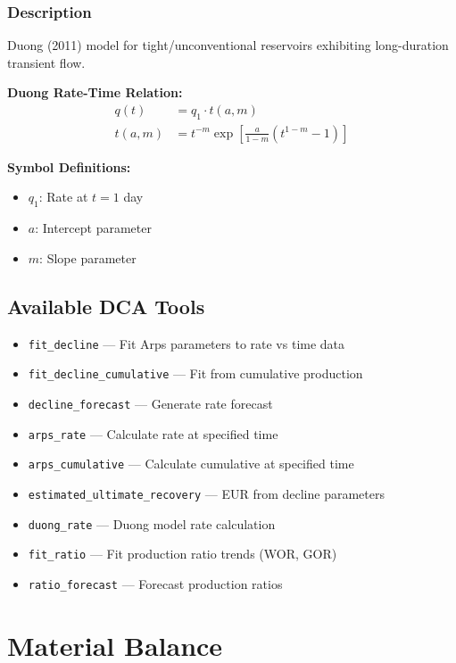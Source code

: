\documentclass[11pt,a4paper]{article}
\newcommand{\symitem}[2]{\item \textbf{#1}: #2}
\begin{document}
\subsubsection{Description}
Duong (2011) model for tight/unconventional reservoirs exhibiting long-duration transient flow.

\begin{tcolorbox}[colback=formulabox,colframe=black!75]
\textbf{Duong Rate-Time Relation:}
\begin{align}
q(t) &= q_1 \cdot t(a, m) \\
t(a, m) &= t^{-m} \exp\left[ \frac{a}{1-m} (t^{1-m} - 1) \right]
\end{align}
\end{tcolorbox}

\textbf{Symbol Definitions:}
\begin{itemize}[leftmargin=2cm]
\symitem{$q_1$}{Rate at $t=1$ day}
\symitem{$a$}{Intercept parameter}
\symitem{$m$}{Slope parameter}
\end{itemize}

\subsection{Available DCA Tools}
\begin{itemize}
\item \texttt{fit\_decline} --- Fit Arps parameters to rate vs time data
\item \texttt{fit\_decline\_cumulative} --- Fit from cumulative production
\item \texttt{decline\_forecast} --- Generate rate forecast
\item \texttt{arps\_rate} --- Calculate rate at specified time
\item \texttt{arps\_cumulative} --- Calculate cumulative at specified time
\item \texttt{estimated\_ultimate\_recovery} --- EUR from decline parameters
\item \texttt{duong\_rate} --- Duong model rate calculation
\item \texttt{fit\_ratio} --- Fit production ratio trends (WOR, GOR)
\item \texttt{ratio\_forecast} --- Forecast production ratios
\end{itemize}

\newpage

\section{Material Balance}
\end{document}
